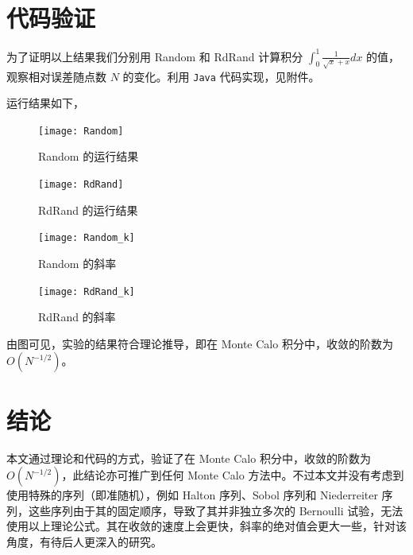 \documentclass[12pt,a4paper]{article}%
\begin{document}
    \section{代码验证}
    为了证明以上结果我们分别用 Random 和 RdRand 计算积分 \(\int^1_0 \frac{1}{\sqrt {x} + x} dx\) 的值，观察相对误差随点数 \(N\) 的变化。利用 \texttt{Java} 代码实现，见附件。
    
    运行结果如下，

    \begin{figure}[h]
        \centering
        \begin{minipage}{0.42\textwidth}
            \centering
            \texttt{[image: Random]}
            \caption{Random 的运行结果}
            \label{fig:img4}
        \end{minipage}\hfill
        \begin{minipage}{0.42\textwidth}
            \centering
            \texttt{[image: RdRand]}
            \caption{RdRand 的运行结果}
            \label{fig:img5}
        \end{minipage}\hfill
        \begin{minipage}{0.42\textwidth}
            \centering
            \texttt{[image: Random\_k]}
            \caption{Random 的斜率}
            \label{fig:img6}
        \end{minipage}\hfill
        \begin{minipage}{0.42\textwidth}
            \centering
            \texttt{[image: RdRand\_k]}
            \caption{RdRand 的斜率}
            \label{fig:img7}
        \end{minipage}
    \end{figure}

    \newpage
    由图可见，实验的结果符合理论推导，即在 Monte Calo 积分中，收敛的阶数为 \(O (N^{-1 / 2})\)。

    \section{结论}
    本文通过理论和代码的方式，验证了在 Monte Calo 积分中，收敛的阶数为 \(O (N^{-1 / 2})\)，此结论亦可推广到任何 Monte Calo 方法中。不过本文并没有考虑到使用特殊的序列（即准随机），例如 Halton 序列、Sobol 序列和 Niederreiter 序列，这些序列由于其的固定顺序，导致了其并非独立多次的 Bernoulli 试验，无法使用以上理论公式。其在收敛的速度上会更快，斜率的绝对值会更大一些，针对该角度，有待后人更深入的研究。
\end{document}
